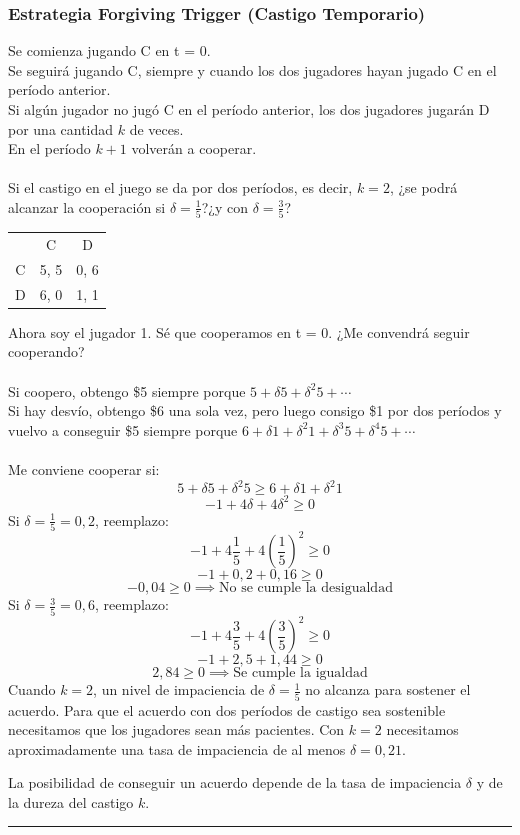 \documentclass{article}
\newcommand*\sepline{%
  \begin{center}
    \rule[1ex]{.5\textwidth}{.5pt}
  \end{center}}
\begin{document}
        \subsubsection*{Estrategia Forgiving Trigger (Castigo Temporario)}
            Se comienza jugando C en t = 0. \\
            Se seguirá jugando C, siempre y cuando los dos jugadores hayan jugado C en el período anterior. \\
            Si algún jugador no jugó C en el período anterior, los dos jugadores jugarán D por una cantidad $k$ de veces. \\
            En el período $k+1$ volverán a cooperar. \\
            \\
            Si el castigo en el juego se da por dos períodos, es decir, $k = 2$, ¿se podrá alcanzar la cooperación si $\delta = \frac{1}{5}$?¿y con $\delta = \frac{3}{5}$?
            \begin{table}[H]
                \centering
                    \begin{tabular}{|c|c|c|}
                          & C    & D    \\
                        C & 5, 5 & 0, 6 \\
                        D & 6, 0 & 1, 1 \\
                    \end{tabular}            
            \end{table}
            Ahora soy el jugador 1. Sé que cooperamos en t = 0. ¿Me convendrá seguir cooperando? \\
            \\
            Si coopero, obtengo \$5 siempre porque \(5 + \delta 5 + \delta^{2}5 + \cdots\) \\
            Si hay desvío, obtengo \$6 una sola vez, pero luego consigo \$1 por dos períodos y vuelvo a conseguir \$5 siempre porque \(6 + \delta 1 + \delta^{2}1 + \delta^{3}5 + \delta^{4}5 + \cdots\) \\
            \\
            Me conviene cooperar si:
            \[5+ \delta 5 + \delta^{2}5 \geq 6 + \delta 1 + \delta^{2}1\]
            \[-1 + 4 \delta + 4 \delta^{2} \geq 0\]
            Si \(\delta = \frac{1}{5} = 0,2\), reemplazo:
            \[-1+4\frac{1}{5}+4(\frac{1}{5})^{2} \geq 0\]
            \[-1+0,2+0,16 \geq 0\]
            \[-0,04 \geq 0 \implies \text{No se cumple la desigualdad}\]
            Si \(\delta = \frac{3}{5} = 0,6\), reemplazo:
            \[-1+4\frac{3}{5}+4(\frac{3}{5})^{2} \geq 0\]
            \[-1+2,5+1,44 \geq 0\]
            \[2,84 \geq 0 \implies \text{Se cumple la igualdad}\]
            Cuando $k = 2$, un nivel de impaciencia de $\delta = \frac{1}{5}$ no alcanza para sostener el acuerdo. Para que el acuerdo con dos períodos de castigo sea sostenible necesitamos que los jugadores sean más pacientes. Con $k = 2$ necesitamos aproximadamente una tasa de impaciencia de al menos $\delta = 0,21$.

            La posibilidad de conseguir un acuerdo depende de la tasa de impaciencia $\delta$ y de la dureza del castigo $k$.

            \sepline
\end{document}
